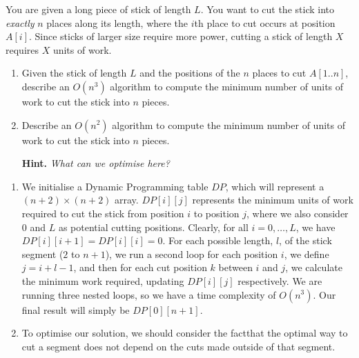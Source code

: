 \documentclass{article}
\begin{document}
\begin{question}
You are given a long piece of stick of length $L$. You want to cut the stick into {\em exactly} $n$ places along its length, where the $i$th place to cut occurs at position $A[i]$. Since sticks of larger size require more power, cutting a stick of length $X$ requires $X$ units of work.

\begin{enumerate}[label = (\alph*)]
    \item Given the stick of length $L$ and the positions of the $n$ places to cut $A[1..n]$, describe an $O(n^3)$ algorithm to compute the minimum number of units of work to cut the stick into $n$ pieces.

    \item Describe an $O(n^2)$ algorithm to compute the minimum number of units of work to cut the stick into $n$ pieces.

    {\bfseries Hint.} {\em What can we optimise here?}
\end{enumerate}
\end{question}

\begin{solution}
\begin{enumerate}[label = (\alph*)]
    \item We initialise a Dynamic Programming table $DP$, which will represent a $(n+2) \times (n+2)$ array. $DP[i][j]$ represents the minimum units of work required to cut the stick from position $i$ to position $j$, where we also consider $0$ and $L$ as potential cutting positions. Clearly, for all $i = 0, \dots, L$, we have $DP[i][i+1] = DP[i][i] = 0$. For each possible length, $l$, of the stick segment ($2$ to $n+1$), we run a second loop for each position $i$, we define $j = i + l - 1$, and then for each cut position $k$ between $i$ and $j$, we calculate the minimum work required, updating $DP[i][j]$ respectively. We are running three nested loops, so we have a time complexity of $O(n^3)$. Our final result will simply be $DP[0][n+1]$.

    \item To optimise our solution, we should consider the factthat the optimal way to cut a segment does not depend on the cuts made outside of that segment. 
\end{enumerate}
\end{solution}
\end{document}
